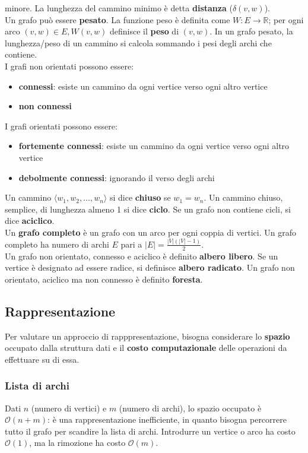 \documentclass[11pt]{article}
\theoremstyle{proprietà}
\begin{document}
minore. La lunghezza del cammino minimo è detta \textbf{distanza} ($\delta (v,w)$).\\
Un grafo può essere \textbf{pesato}. La funzione peso è definita come $W:E\rightarrow \mathbb{R}$; per ogni arco
$(v,w)\in E,W(v,w)$ definisce il \textbf{peso} di $(v,w)$. In un grafo pesato, la lunghezza/peso di un cammino si calcola 
sommando i pesi degli archi che contiene.\\
I grafi non orientati possono essere:
\begin{itemize}
    \item \textbf{connessi}: esiste un cammino da ogni vertice verso ogni altro vertice
    \item \textbf{non connessi}
\end{itemize}
I grafi orientati possono essere:
\begin{itemize}
    \item \textbf{fortemente connessi}: esiste un cammino da ogni vertice verso ogni altro vertice
    \item \textbf{debolmente connessi}: ignorando il verso degli archi
\end{itemize}
Un cammino $\langle w_1,w_2,...,w_n \rangle$ si dice \textbf{chiuso} se $w_1=w_n$. Un cammino chiuso, semplice, di lunghezza 
almeno 1 si dice \textbf{ciclo}. Se un grafo non contiene cicli, si dice \textbf{aciclico}.\\
Un \textbf{grafo completo} è un grafo con un arco per ogni coppia di vertici. Un grafo completo ha numero di archi $E$ pari 
a $|E| = \frac{|V|(|V|-1)}{2}$.\\
Un grafo non orientato, connesso e aciclico è definito \textbf{albero libero}. Se un vertice è designato ad essere radice, 
si definisce \textbf{albero radicato}. Un grafo non orientato, aciclico ma non connesso è definito \textbf{foresta}.
\subsection{Rappresentazione}
Per valutare un approccio di rapppresentazione, bisogna considerare lo \textbf{spazio} occupato dalla struttura dati e il 
\textbf{costo computazionale} delle operazioni da effettuare su di essa.
\subsubsection{Lista di archi}
Dati $n$ (numero di vertici) e $m$ (numero di archi), lo spazio occupato è $\mathcal{O}(n+m)$: è una rappresentazione 
inefficiente, in quanto bisogna percorrere tutto il grafo per scandire la lista di archi. Introdurre un vertice o arco ha 
costo $\mathcal{O}(1)$, ma la rimozione ha costo $\mathcal{O}(m)$.
\end{document}
